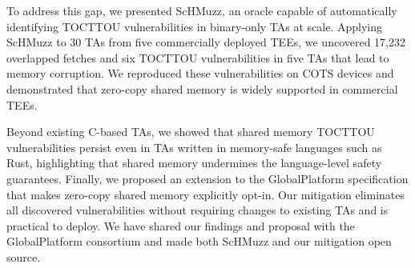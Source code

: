 \documentclass[conference]{IEEEtran}
\newcommand{\sysname}{ScHMuzz\xspace}
\newcommand{\optee}{OP-TEE\xspace}
\newcommand{\numTAs}{66\xspace}
\newcommand{\numTAsharnessed}{30\xspace}
\newcommand{\numTEEs}{five\xspace}
\newcommand{\numdfsmerge}{17,232\xspace}
\newcommand{\numvulns}{six\xspace}
\newcommand{\numvulnTAs}{five\xspace}
\begin{document}
To address this gap, we presented \sysname, an oracle capable of automatically 
identifying TOCTTOU vulnerabilities in binary-only TAs at scale. Applying \sysname 
to \numTAsharnessed{} TAs from \numTEEs{} commercially deployed TEEs, we uncovered 
\numdfsmerge{} overlapped fetches and \numvulns{} TOCTTOU vulnerabilities in \numvulnTAs{} TAs that 
lead to memory corruption. We reproduced these vulnerabilities on COTS 
devices and demonstrated that zero-copy shared memory is widely supported in commercial TEEs.
 
Beyond existing C-based TAs, we showed that shared memory TOCTTOU vulnerabilities persist even in 
TAs written in memory-safe languages such as Rust, highlighting that shared memory undermines 
the language-level safety guarantees. Finally, we proposed an extension 
to the GlobalPlatform specification that makes zero-copy shared memory explicitly opt-in. 
Our mitigation eliminates all discovered vulnerabilities without requiring changes to existing 
TAs and is practical to deploy. We have shared our findings and proposal with the GlobalPlatform 
consortium and made both \sysname and our mitigation open source.

%
 
\end{document}
